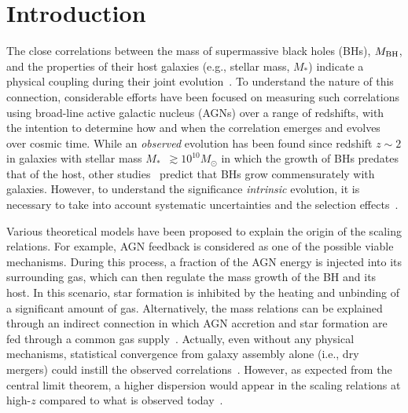 \documentclass[twocolumn]{aastex631}
\def\smass{{$M_*$}}
\def\mbh{$M_{\rm BH}$}
\begin{document}
\section{Introduction} \label{sec:intro}
The close correlations between the mass of supermassive black holes (BHs), \mbh, and the properties of their host galaxies (e.g., stellar mass, \smass) indicate a physical coupling during their joint evolution~\citep{Mag++98, F+M00, M+H03, H+R04, Gul++09}. To understand the nature of this connection, considerable efforts have been focused on measuring such correlations using broad-line active galactic nucleus (AGNs) over a range of redshifts, with the intention to determine how and when the correlation emerges and evolves over cosmic time. While an {\it observed} evolution has been found since redshift $z\sim2$ in galaxies with stellar mass \smass\ $\gtrsim 10^{10}M_{\odot}$ \citep[e.g.,][]{Tre++04, Peng2006a,Tre++07,Woo++08,Bennert11,Park15} in which the growth of BHs predates that of the host, other studies~\citep[e.g.,][]{Schramm2013, Sun2015, 2021ApJ...906..103L} predict that BHs grow commensurately with galaxies.
However, to understand the significance {\it intrinsic} evolution, it is necessary to take into account systematic uncertainties and the selection effects~\citep{Tre++07, Lauer2007, Schulze2014, Park15,Jahnke2009,  Ding2020,Li2021b}. 

Various theoretical models have been proposed to explain the origin of the scaling relations. For example, AGN feedback is considered as one of the possible viable mechanisms. During this process, a fraction of the AGN energy is injected into its surrounding gas, which can then regulate the mass growth of the BH and its host. In this scenario, star formation is inhibited by the heating and unbinding of a significant amount of gas. Alternatively, the mass relations can be explained through an indirect connection in which AGN accretion and star formation are fed through a common gas supply~\citep{Cen2015, Menci2016, angles_black_2017}. Actually, even without any physical mechanisms, statistical convergence from galaxy assembly alone (i.e., dry mergers) could instill the observed correlations~\citep{Peng2007, Jahnke2011, Hirschmann2010}. However, as expected from the central limit theorem, a higher dispersion would appear in the scaling relations at high-$z$ compared to what is observed today~\citep[e.g.,][]{Ginat2016, 2020MNRAS.498.5652K}. 
\end{document}
